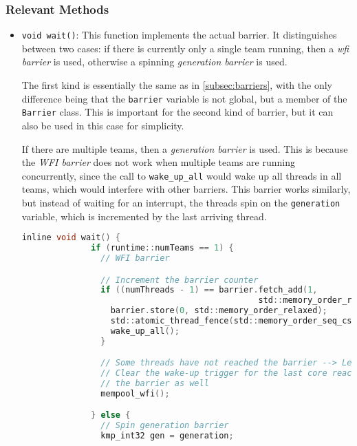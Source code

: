 \subsubsection{Relevant Methods}

\begin{itemize}
	\item \texttt{void wait()}: This function implements the actual barrier. It distinguishes
	      between two cases: if there is currently only a single team running, then a
	      \emph{\gls{wfi} barrier} is used, otherwise a spinning \emph{generation barrier} is used.

	      The first kind is essentially the same as in \cref{subsec:barriers}, with the only
	      difference being that the \texttt{barrier} variable is not global, but a member of the
	      \texttt{Barrier} class. This is important for the second kind of barrier, but it can also
	      be used in this case for simplicity.

	      If there are multiple teams, then a \emph{generation barrier} is used. This is because the
	      \emph{WFI barrier} does not work when multiple teams are running concurrently, since the
	      call to \texttt{wake\_up\_all} would wake up all threads in all teams, which would
	      interfere with other barriers. This barrier works similarly, but instead of waiting for an
	      interrupt, the threads spin on the \texttt{generation} variable, which is incremented by
	      the last arriving thread.

	      \begin{lstlisting}[language=C, caption={Barrier::wait}, label={lst:barrier-wait},
          escapechar=@]
            inline void wait() {
              if (runtime::numTeams == 1) {
                // WFI barrier

                // Increment the barrier counter
                if ((numThreads - 1) == barrier.fetch_add(1,
                                                std::memory_order_relaxed)) {
                  barrier.store(0, std::memory_order_relaxed);
                  std::atomic_thread_fence(std::memory_order_seq_cst);
                  wake_up_all();
                }

                // Some threads have not reached the barrier --> Let's wait
                // Clear the wake-up trigger for the last core reaching
                // the barrier as well
                mempool_wfi();

              } else {
                // Spin generation barrier
                kmp_int32 gen = generation;


\end{lstlisting}
\end{itemize}
